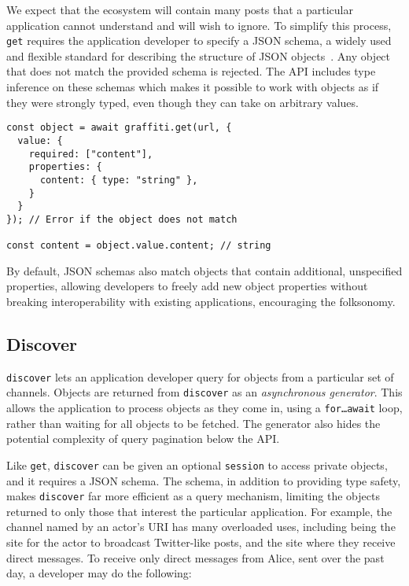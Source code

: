 We expect that the ecosystem will contain many posts that a particular application cannot understand and will wish to ignore.  To simplify this process,
\texttt{get} requires the application developer to specify
a JSON schema, a widely used and flexible standard for describing
the structure of JSON objects~\cite{jsonschema}.
Any object that does not match the provided schema is rejected.
The API includes type inference on these schemas which makes it possible to work
with objects as if they were strongly typed, even though they can take on arbitrary values.

\begin{verbatim}
const object = await graffiti.get(url, {
  value: {
    required: ["content"],
    properties: {
      content: { type: "string" },
    }
  }
}); // Error if the object does not match

const content = object.value.content; // string
\end{verbatim}

By default, JSON schemas also match objects that contain additional,
unspecified properties, allowing developers to freely
add new object properties without breaking
interoperability with existing applications,
encouraging the folksonomy.

\subsection{Discover}

\texttt{discover} lets an application developer query for objects
from a particular set of channels.
Objects are returned from \texttt{discover} as an \emph{asynchronous generator}.
This allows the application to process objects as they come in,
using a \texttt{for\ldots{await}} loop, rather than waiting for all objects
to be fetched. The generator also hides the potential complexity of
query pagination below the API.

Like \texttt{get}, \texttt{discover} can be given an optional \texttt{session}
to access private objects, and it requires a JSON schema.
The schema,
in addition to providing type safety, makes \texttt{discover} far more efficient
as a query mechanism, limiting the objects returned to only those that interest the particular application.
For example, the channel named by an actor's URI has many overloaded uses,
including being the site for the actor to broadcast Twitter-like posts,
and the site where they receive direct messages.
To receive only direct messages from Alice,
sent over the past day, a developer may do the following:

